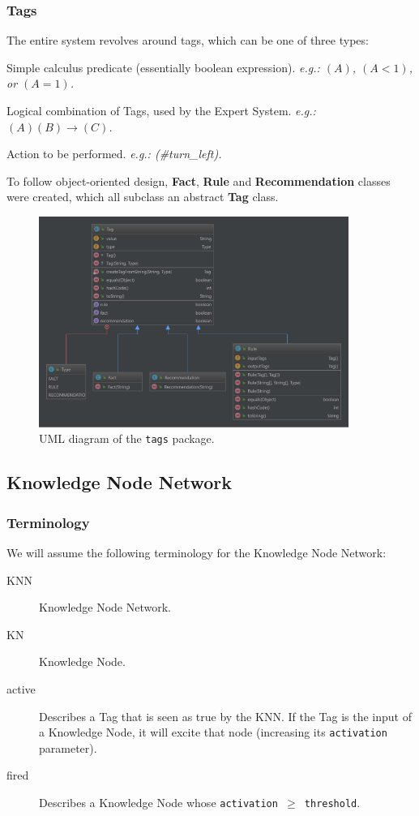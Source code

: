 \documentclass{beamer}
\newcommand{\code}[1]{\texttt{#1}}
\begin{document}
	\begin{frame}
		\frametitle{Tags}
		The entire system revolves around tags, which can be one of three types:
		\begin{description}[Recommendation]
			\item[Fact] Simple calculus predicate (essentially boolean expression). \emph{e.g.: $(A)$, $(A < 1)$, or $(A = 1)$.}
			\item[Rule] Logical combination of Tags, used by the Expert System. \emph{e.g.: $(A)(B)\rightarrow(C)$.}
			\item[Recommendation] Action to be performed. \emph{e.g.: (\#turn\_left).}
		\end{description}
		To follow object-oriented design, \textbf{Fact}, \textbf{Rule} and \textbf{Recommendation} classes were created, which all subclass an abstract \textbf{Tag} class.
	\end{frame}

	\begin{frame}
		\begin{figure}
			\centering
			\includegraphics[width=0.9\textwidth]{figures/uml_tags.pdf}
			\caption
			{UML diagram of the \code{tags} package.}
			\label{fig:uml_tags}
		\end{figure}
	\end{frame}
	
	\subsection{Knowledge Node Network}
	
	\begin{frame}
		\frametitle{Terminology}
		We will assume the following terminology for the Knowledge Node Network:
		\begin{description}
			\item[KNN] Knowledge Node Network.
			\item[KN] Knowledge Node.
			\item[active] Describes a Tag that is seen as true by the KNN. If the Tag is the input of a Knowledge Node, it will excite that node (increasing its \code{activation} parameter).
			\item[fired] Describes a Knowledge Node whose \code{activation $\geq$ threshold}.
		\end{description}
	\end{frame}
\end{document}
